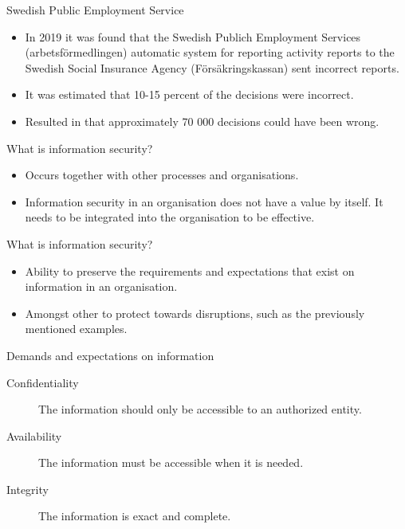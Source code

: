 \documentclass{beamer}
\begin{document}
\begin{frame}{Swedish Public Employment Service}
  \begin{itemize}
    \item In 2019 it was found that the Swedish Publich Employment Services
      (arbetsförmedlingen) automatic system for reporting activity reports to
      the Swedish Social Insurance Agency (Försäkringskassan) sent incorrect
      reports.
    \item It was estimated that 10-15 percent of the decisions were incorrect.
    \item Resulted in that approximately 70 000 decisions could have been wrong.
  \end{itemize}
\end{frame}

\begin{frame}{What is information security?}
  \begin{itemize}
    \item Occurs together with other processes and organisations.
    \item Information security in an organisation does not have a value by
      itself. It needs to be integrated into the organisation to be effective.
  \end{itemize}
\end{frame}

\begin{frame}{What is information security?}
  \begin{itemize}
    \item Ability to preserve the requirements and expectations that exist on
      information in an organisation.
    \item Amongst other to protect towards disruptions, such as the previously
      mentioned examples.
  \end{itemize}
\end{frame}

\begin{frame}{Demands and expectations on information}
  \begin{description}
    \item[Confidentiality] The information should only be accessible to an
      authorized entity.

    \item[Availability] The information must be accessible when it is needed.

    \item[Integrity] The information is exact and complete.

  \end{description}
\end{frame}
\end{document}
